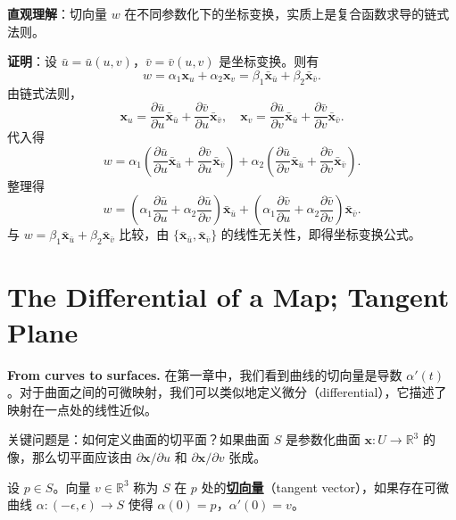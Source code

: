 \begin{solution}
\textbf{直观理解}：切向量 $w$ 在不同参数化下的坐标变换，实质上是复合函数求导的链式法则。

\textbf{证明}：设 $\bar{u} = \bar{u}(u,v)$，$\bar{v} = \bar{v}(u,v)$ 是坐标变换。则有
\[
w = \alpha_1 \mathbf{x}_u + \alpha_2 \mathbf{x}_v = \beta_1 \bar{\mathbf{x}}_{\bar{u}} + \beta_2 \bar{\mathbf{x}}_{\bar{v}}.
\]
由链式法则，
\[
\mathbf{x}_u = \frac{\partial \bar{u}}{\partial u} \bar{\mathbf{x}}_{\bar{u}} + \frac{\partial \bar{v}}{\partial u} \bar{\mathbf{x}}_{\bar{v}}, \quad
\mathbf{x}_v = \frac{\partial \bar{u}}{\partial v} \bar{\mathbf{x}}_{\bar{u}} + \frac{\partial \bar{v}}{\partial v} \bar{\mathbf{x}}_{\bar{v}}.
\]
代入得
\[
w = \alpha_1\left(\frac{\partial \bar{u}}{\partial u} \bar{\mathbf{x}}_{\bar{u}} + \frac{\partial \bar{v}}{\partial u} \bar{\mathbf{x}}_{\bar{v}}\right) + \alpha_2\left(\frac{\partial \bar{u}}{\partial v} \bar{\mathbf{x}}_{\bar{u}} + \frac{\partial \bar{v}}{\partial v} \bar{\mathbf{x}}_{\bar{v}}\right).
\]
整理得
\[
w = \left(\alpha_1 \frac{\partial \bar{u}}{\partial u} + \alpha_2 \frac{\partial \bar{u}}{\partial v}\right) \bar{\mathbf{x}}_{\bar{u}} + \left(\alpha_1 \frac{\partial \bar{v}}{\partial u} + \alpha_2 \frac{\partial \bar{v}}{\partial v}\right) \bar{\mathbf{x}}_{\bar{v}}.
\]
与 $w = \beta_1 \bar{\mathbf{x}}_{\bar{u}} + \beta_2 \bar{\mathbf{x}}_{\bar{v}}$ 比较，由 $\{\bar{\mathbf{x}}_{\bar{u}}, \bar{\mathbf{x}}_{\bar{v}}\}$ 的线性无关性，即得坐标变换公式。
\end{solution}

\section{The Differential of a Map; Tangent Plane}\label{sec:differential-tangent-plane}

\textbf{From curves to surfaces.} 在第一章中，我们看到曲线的切向量是导数 $\alpha'(t)$。对于曲面之间的可微映射，我们可以类似地定义微分（differential），它描述了映射在一点处的线性近似。

关键问题是：如何定义曲面的切平面？如果曲面 $S$ 是参数化曲面 $\mathbf{x}: U \to \mathbb{R}^3$ 的像，那么切平面应该由 $\partial\mathbf{x}/\partial u$ 和 $\partial\mathbf{x}/\partial v$ 张成。

\begin{Definition}[切向量]\label{def:tangent-vector-surface}
设 $p \in S$。向量 $v \in \mathbb{R}^3$ 称为 $S$ 在 $p$ 处的\textbf{\underline{切向量}}（tangent vector），如果存在可微曲线 $\alpha: (-\epsilon, \epsilon) \to S$ 使得 $\alpha(0) = p$，$\alpha'(0) = v$。
\end{Definition}

